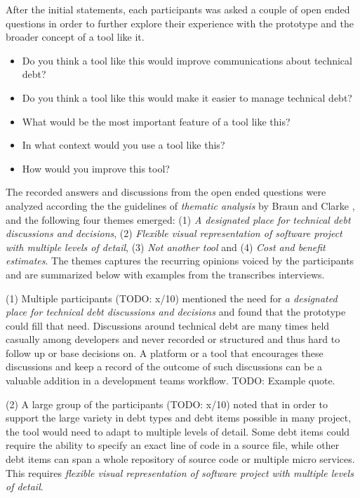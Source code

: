 After the initial statements, each participants was asked a couple of open ended questions in order to further explore their experience with the prototype and the broader concept of a tool like it.

\smallskip
\begin{itemize}
  \item Do you think a tool like this would improve communications about technical debt?
  \item Do you think a tool like this would make it easier to manage technical debt?
  \item What would be the most important feature of a tool like this?
  \item In what context would you use a tool like this?
  \item How would you improve this tool?
\end{itemize}
\smallskip

The recorded answers and discussions from the open ended questions were analyzed according the the guidelines of \textit{thematic analysis} by Braun and Clarke \cite{braun_using_2006}, and the following four themes emerged:
(1) \textit{A designated place for technical debt discussions and decisions}, (2) \textit{Flexible visual representation of software project with multiple levels of detail}, (3) \textit{Not another tool} and (4) \textit{Cost and benefit estimates}.
The themes captures the recurring opinions voiced by the participants and are summarized below with examples from the transcribes interviews.

(1) Multiple participants (TODO: x/10) mentioned the need for \textit{a designated place for technical debt discussions and decisions} and found that the prototype could fill that need.
Discussions around technical debt are many times held casually among developers and never recorded or structured and thus hard to follow up or base decisions on.
A platform or a tool that encourages these discussions and keep a record of the outcome of such discussions can be a valuable addition in a development teams workflow. 
TODO: Example quote.

(2) A large group of the participants (TODO: x/10) noted that in order to support the large variety in debt types and debt items possible in many project, the tool would need to adapt to multiple levels of detail.
Some debt items could require the ability to specify an exact line of code in a source file, while other debt items can span a whole repository of source code or multiple micro services.
This requires \textit{flexible visual representation of software project with multiple levels of detail}.

